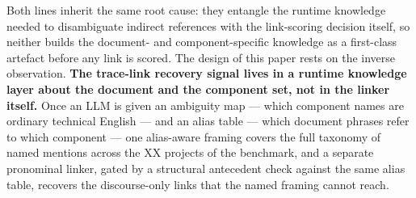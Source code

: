 Both lines inherit the same root cause: they entangle the runtime knowledge needed to disambiguate indirect references with the link-scoring decision itself, so neither builds the document- and component-specific knowledge as a first-class artefact before any link is scored.
The design of this paper rests on the inverse observation.
\textbf{The trace-link recovery signal lives in a runtime knowledge layer about the document and the component set, not in the linker itself.}
Once an \ac{LLM} is given an ambiguity map --- which component names are ordinary technical English --- and an alias table --- which document phrases refer to which component --- one alias-aware framing covers the full taxonomy of named mentions across the XX projects of the benchmark, and a separate pronominal linker, gated by a structural antecedent check against the same alias table, recovers the discourse-only links that the named framing cannot reach.

